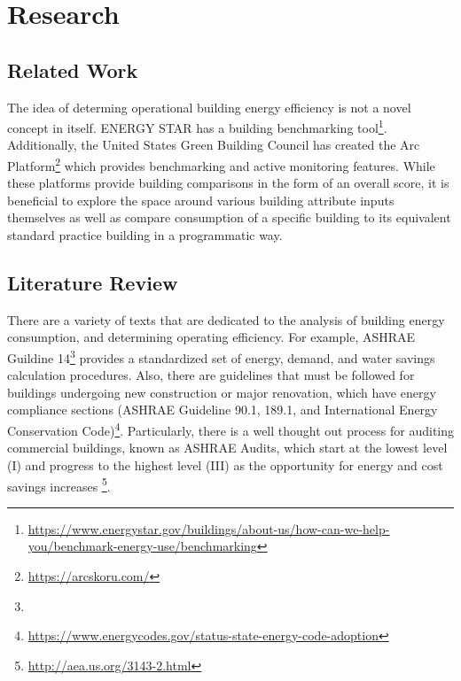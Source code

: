 \section{Research}
\label{sec:literature_review}

\subsection{Related Work}
The idea of determing operational building energy efficiency is not a novel concept in itself.  ENERGY STAR has a building benchmarking tool\footnote{\href{https://www.energystar.gov/buildings/about-us/how-can-we-help-you/benchmark-energy-use/benchmarking }{\url{https://www.energystar.gov/buildings/about-us/how-can-we-help-you/benchmark-energy-use/benchmarking}}}.  Additionally, the United States Green Building Council has created the Arc Platform\footnote{\href{https://arcskoru.com/}{\url{https://arcskoru.com/}}} which provides benchmarking and active monitoring features.  While these platforms provide building comparisons in the form of an overall score, it is beneficial to explore the space around various building attribute inputs themselves as well as compare consumption of a specific building to its equivalent standard practice building in a programmatic way.

\subsection{Literature Review}

There are a variety of texts that are dedicated to the analysis of building energy consumption, and determining operating efficiency.  For example, ASHRAE Guildine 14\footnote{} provides a standardized set of energy, demand, and water savings calculation procedures.  Also, there are guidelines that must be followed for buildings undergoing new construction or major renovation, which have energy compliance sections (ASHRAE Guideline 90.1, 189.1, and International Energy Conservation Code)\footnote{\href{https://www.energycodes.gov/status-state-energy-code-adoption}{\url{https://www.energycodes.gov/status-state-energy-code-adoption}}}.  Particularly, there is a well thought out process for auditing commercial buildings, known as ASHRAE Audits, which start at the lowest level (I) and progress to the highest level (III) as the opportunity for energy and cost savings increases \footnote{\href{http://aea.us.org/3143-2.html}{\url{http://aea.us.org/3143-2.html}}}.  